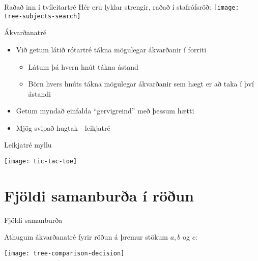 \documentclass[handout]{beamer}
\begin{document}
\begin{frame}{Raðað inn í tvíleitartré}
Hér eru lyklar strengir, raðað í stafrófsröð:
\texttt{[image: tree-subjects-search]}
\end{frame}

\begin{frame}{Ákvarðanatré}
\begin{itemize}
 \item Við getum látið rótartré tákna mögulegar ákvarðanir í forriti
 \begin{itemize}
  \item Látum þá hvern hnút tákna ástand
  \item Börn hvers hnúts tákna mögulegar ákvarðanir sem hægt er að taka í því ástandi
 \end{itemize}
 \item Getum myndað einfalda ``gervigreind'' með þessum hætti
 \item Mjög svipað hugtak - leikjatré
\end{itemize}
\end{frame}

\begin{frame}{Leikjatré myllu}
\begin{center}
\texttt{[image: tic-tac-toe]}
\end{center}
\end{frame}

\section{Fjöldi samanburða í röðun}

\begin{frame}{Fjöldi samanburða}
\begin{center}
Athugum ákvarðanatré fyrir röðun á þremur stökum $a, b$ og $c$:

\texttt{[image: tree-comparison-decision]}
\end{center}
\end{frame}
\end{document}
